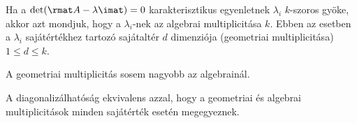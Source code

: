 \documentclass[a4paper, 12pt]{scrartcl}
\begin{document}
\begin{blueBox}

  Ha a $\det(\rmat A - \lambda \imat) = 0$ karakterisztikus egyenletnek
  $\lambda_i$ $k$-szoros gyöke, akkor azt mondjuk, hogy a $\lambda_i$-nek az
  algebrai multiplicitása $k$. Ebben az esetben a $\lambda_i$ sajátértékhez
  tartozó sajátaltér $d$ dimenziója (geometriai multiplicitása)
  $1 \leq d \leq k$.
\end{blueBox}

\begin{note}
  A geometriai multiplicitás sosem nagyobb az algebrainál.

  A diagonalizálhatóság ekvivalens azzal, hogy a geometriai és algebrai
  multiplicitások minden sajátérték esetén megegyeznek.
\end{note}
\end{document}
